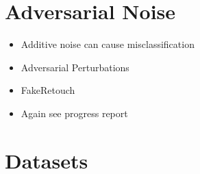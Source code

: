 \section{Adversarial Noise}

\begin{itemize}
    \item Additive noise can cause misclassification
    \item Adversarial Perturbations
    \item FakeRetouch
    \item Again see progress report
\end{itemize}

\section{Datasets}